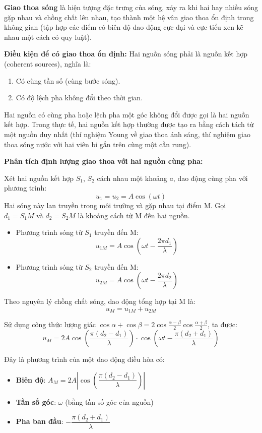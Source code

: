 \textbf{Giao thoa sóng} là hiện tượng đặc trưng của sóng, xảy ra khi hai hay nhiều sóng gặp nhau và chồng chất lên nhau, tạo thành một hệ vân giao thoa ổn định trong không gian (tập hợp các điểm có biên độ dao động cực đại và cực tiểu xen kẽ nhau một cách có quy luật).

\textbf{Điều kiện để có giao thoa ổn định:} Hai nguồn sóng phải là nguồn kết hợp (coherent sources), nghĩa là:
\begin{enumerate}
    \item Có cùng tần số (cùng bước sóng).
    \item Có độ lệch pha không đổi theo thời gian.
\end{enumerate}
Hai nguồn có cùng pha hoặc lệch pha một góc không đổi được gọi là hai nguồn kết hợp. Trong thực tế, hai nguồn kết hợp thường được tạo ra bằng cách tách từ một nguồn duy nhất (thí nghiệm Young về giao thoa ánh sáng, thí nghiệm giao thoa sóng nước với hai viên bi gắn trên cùng một cần rung).

\textbf{Phân tích định lượng giao thoa với hai nguồn cùng pha:}

Xét hai nguồn kết hợp $S_1$, $S_2$ cách nhau một khoảng $a$, dao động cùng pha với phương trình:
\[
    u_1 = u_2 = A\cos(\omega t)
\]
Hai sóng này lan truyền trong môi trường và gặp nhau tại điểm M. Gọi $d_1 = S_1M$ và $d_2 = S_2M$ là khoảng cách từ M đến hai nguồn.

\begin{itemize}
    \item Phương trình sóng từ $S_1$ truyền đến M:
    \[
        u_{1M} = A\cos\left(\omega t - \frac{2\pi d_1}{\lambda}\right)
    \]
    \item Phương trình sóng từ $S_2$ truyền đến M:
    \[
        u_{2M} = A\cos\left(\omega t - \frac{2\pi d_2}{\lambda}\right)
    \]
\end{itemize}

Theo nguyên lý chồng chất sóng, dao động tổng hợp tại M là:
\[
    u_M = u_{1M} + u_{2M}
\]

Sử dụng công thức lượng giác $\cos\alpha + \cos\beta = 2\cos\frac{\alpha-\beta}{2}\cos\frac{\alpha+\beta}{2}$, ta được:
\[
    u_M = 2A\cos\left(\frac{\pi(d_2 - d_1)}{\lambda}\right) \cdot \cos\left(\omega t - \frac{\pi(d_2 + d_1)}{\lambda}\right)
\]

Đây là phương trình của một dao động điều hòa có:
\begin{itemize}
    \item \textbf{Biên độ}: $A_M = 2A\left|\cos\left(\dfrac{\pi(d_2 - d_1)}{\lambda}\right)\right|$
    \item \textbf{Tần số góc}: $\omega$ (bằng tần số góc của nguồn)
    \item \textbf{Pha ban đầu}: $-\dfrac{\pi(d_2 + d_1)}{\lambda}$
\end{itemize}

